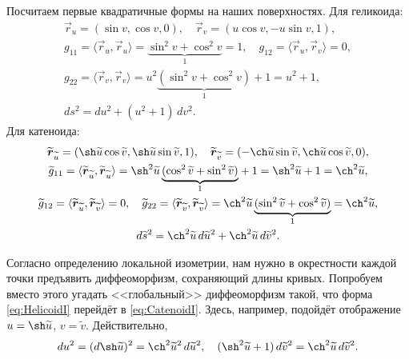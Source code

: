 \begin{solution}
	Посчитаем первые квадратичные формы на наших поверхностях. Для геликоида:
	\begin{gather} \label{eq:HelicoidI}
		\vec{r}_u = (\sin v, \cos v, 0),\quad \vec{r}_v = (u\cos v, -u\sin v, 1),\nonumber\\
		g_{11} = \langle\vec{r}_u, \vec{r}_u\rangle = {\underbrace{\sin^2v + \cos^2v}_{1}} = 1,\quad g_{12} = \langle\vec{r}_u, \vec{r}_v\rangle = 0,\nonumber\\
		g_{22} = \langle\vec{r}_v, \vec{r}_v\rangle = u^2{\underbrace{(\sin^2v + \cos^2v)}_{1}} + 1 = u^2 + 1,\nonumber\\
		ds^2 = du^2 + (u^2 + 1)\,dv^2.
	\end{gather}
	Для катеноида:
	\begin{gather}
		\widetilde{\vec{r}}_{\widetilde{u}} = (\sh \widetilde{u}\cos \widetilde{v}, \sh \widetilde{u}\sin \widetilde{v}, 1),\quad \widetilde{\vec{r}}_{\widetilde{v}} = (-\ch \widetilde{u}\sin \widetilde{v}, \ch \widetilde{u}\cos \widetilde{v}, 0),\nonumber\\
		\widetilde{g}_{11} = \langle\widetilde{\vec{r}}_{\widetilde{u}}, \widetilde{\vec{r}}_{\widetilde{u}}\rangle = \sh^2\widetilde{u}\,{\underbrace{(\cos^2\widetilde{v} + \sin^2\widetilde{v})}_{1}} + 1 = \sh^2\widetilde{u} + 1 = \ch^2\widetilde{u},\nonumber\\
		\widetilde{g}_{12} = \langle\widetilde{\vec{r}}_{\widetilde{u}}, \widetilde{\vec{r}}_{\widetilde{v}}\rangle = 0,\quad
		\widetilde{g}_{22} = \langle\widetilde{\vec{r}}_{\widetilde{v}}, \widetilde{\vec{r}}_{\widetilde{v}}\rangle = \ch^2\widetilde{u}\,{\underbrace{(\sin^2\widetilde{v} + \cos^2\widetilde{v})}_{1}} = \ch^2\widetilde{u},\nonumber\\
		d\widetilde{s}^2 = \ch^2\widetilde{u}\,d\widetilde{u}^2 + \ch^2\widetilde{u}\,d\widetilde{v}^2. \label{eq:CatenoidI}
	\end{gather}

	Согласно определению локальной изометрии, нам нужно в окрестности каждой точки предъявить диффеоморфизм, сохраняющий длины кривых. Попробуем вместо этого угадать <<глобальный>> диффеоморфизм такой, что форма \eqref{eq:HelicoidI} перейдёт в \eqref{eq:CatenoidI}. Здесь, например, подойдёт отображение $u = \sh\widetilde{u}$, $v = \widetilde{v}$. Действительно,
	\[
		du^2 = (d\sh\widetilde{u})^2 = \ch^2\widetilde{u}^2\,d\widetilde{u}^2,\quad(\sh^2\widetilde{u} + 1)\,d\widetilde{v}^2 = \ch^2\widetilde{u}\,d\widetilde{v}^2.
	\]
\end{solution}

